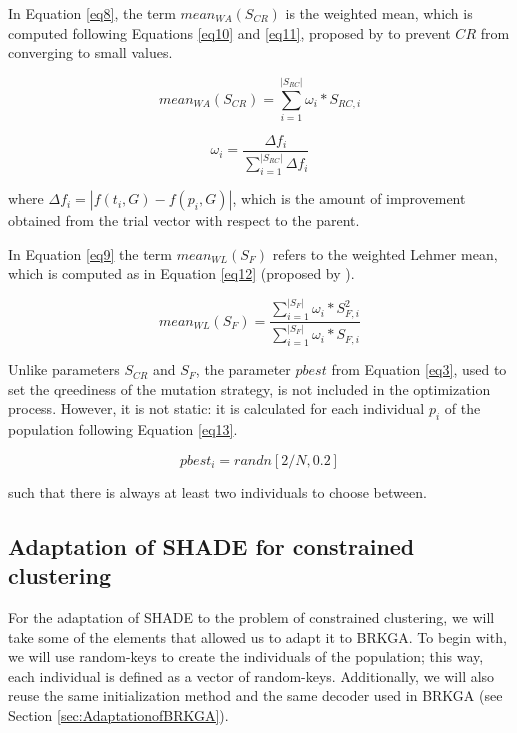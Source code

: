 \documentclass[review]{elsarticle}
\begin{document}
In Equation \ref{eq8}, the term $mean_{WA} (S_{CR})$ is the weighted mean, which is computed following Equations \eqref{eq10} and \eqref{eq11}, proposed by \cite{peng2009multi} to prevent $CR$ from converging to small values.

\begin{equation}
mean_{WA} (S_{CR}) = \sum_{i = 1}^{|S_{RC}|} \omega_i * S_{RC,i}
\label{eq10}
\end{equation}

\begin{equation}
\omega_i = \frac{\Delta f_i}{\sum_{i = 1}^{|S_{RC}|} \Delta f_i}
\label{eq11}
\end{equation}

where $\Delta f_i = |f(t_i,G) - f(p_i, G)|$, which is the amount of improvement obtained from the trial vector with respect to the parent.

In Equation \ref{eq9} the term $mean_{WL} (S_{F})$ refers to the weighted Lehmer mean, which is computed as in Equation \eqref{eq12} (proposed by \cite{tanabe2013success}).

\begin{equation}
mean_{WL} (S_{F}) = \frac{\sum_{i = 1}^{|S_{F}|} \omega_i * S^2_{F,i}}{\sum_{i = 1}^{|S_{F}|} \omega_i * S_{F,i}}
\label{eq12}
\end{equation}

Unlike parameters $S_{CR}$ and $S_F$, the parameter $pbest$ from Equation \eqref{eq3}, used to set the qreediness of the mutation strategy, is not included in the optimization process. However, it is not static: it is calculated for each individual $p_i$ of the population following Equation \eqref{eq13}.

\begin{equation}
pbest_i = randn[2/N, 0.2]
\label{eq13}
\end{equation}

such that there is always at least two individuals to choose between.

\subsection{Adaptation of SHADE for constrained clustering}

For the adaptation of SHADE to the problem of constrained clustering, we will take some of the elements that allowed us to adapt it to BRKGA. To begin with, we will use random-keys to create the individuals of the population; this way, each individual is defined as a vector of random-keys. Additionally, we will also reuse the same initialization method and the same decoder used in BRKGA (see Section \ref{sec:AdaptationofBRKGA}).
\end{document}
